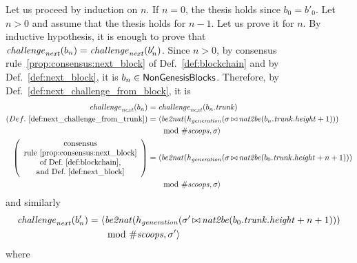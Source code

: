 \noindent
  Let us proceed by induction on $n$.
  If $n=0$, the thesis holds since $b_0=b'_0$.
  Let $n>0$ and assume that the thesis holds for $n-1$. Let us prove it for $n$.
  By inductive hypothesis, it is enough
  to prove that ${\mathit{challenge}}_{\mathit{next}}(b_n)={\mathit{challenge}}_{\mathit{next}}(b'_n)$.
  Since $n>0$, by consensus rule~\ref{prop:consensus:next_block} of Def.~\ref{def:blockchain}
  and by Def.~\ref{def:next_block}, it is $b_n\in{\mathsf{NonGenesisBlocks}}$. Therefore, by
  Def.~\ref{def:next_challenge_from_block}, it is
  \begin{align*}
    {\mathit{challenge}}_{\mathit{next}}(b_n)&={\mathit{challenge}}_{\mathit{next}}(b_n.{\mathit{trunk}})\\
    (Def.~\ref{def:next_challenge_from_trunk})&=\langle{\mathit{be2nat}}(h_{\mathit{generation}}(\sigma\operatorname*{\bowtie}{\mathit{nat2be}}(b_n.{\mathit{trunk}}.{\mathit{height}}+1)))\\
    &\qquad\text{mod }{\#\mathit{scoops}},\sigma\rangle\\
    \left(\begin{array}{c}
      \text{consensus}\\
      \text{rule~\ref{prop:consensus:next_block}}\\
      \text{of Def.~\ref{def:blockchain},}\\
      \text{and Def.~\ref{def:next_block}}
    \end{array}\right)&=\langle{\mathit{be2nat}}(h_{\mathit{generation}}(\sigma\operatorname*{\bowtie}{\mathit{nat2be}}(b_0.{\mathit{trunk}}.{\mathit{height}}+n+1)))\\
    &\qquad\text{mod }{\#\mathit{scoops}},\sigma\rangle
  \end{align*}
  and similarly
  \begin{align*}
    {\mathit{challenge}}_{\mathit{next}}(b'_n)&=\langle{\mathit{be2nat}}(h_{\mathit{generation}}(\sigma'\operatorname*{\bowtie}{\mathit{nat2be}}(b_0.{\mathit{trunk}}.{\mathit{height}}+n+1)))\\
    &\qquad\text{mod }{\#\mathit{scoops}},\sigma'\rangle
  \end{align*}
  where
